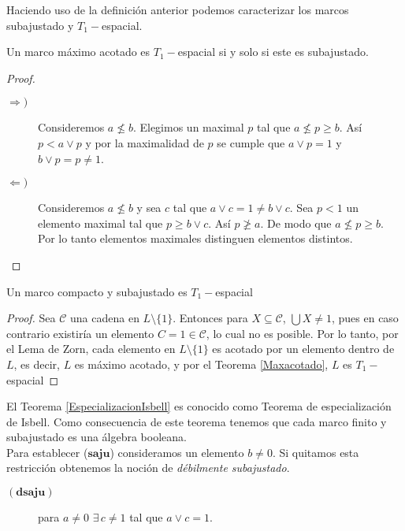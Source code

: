 \documentclass{comunicaciones}
\begin{document}
Haciendo uso de la definición anterior podemos caracterizar los marcos subajustado y $T_1-$espacial.

\begin{thm}\label{Maxacotado}
    Un marco máximo acotado es $T_1-$espacial si y solo si este es subajustado.
\end{thm}

\begin{proof}
    \begin{description}
        \item[$\Rightarrow )$] Consideremos $a\nleq b$. Elegimos un maximal $p$ tal que $a\nleq p \geq b$. Así $p< a\vee p$  y por la maximalidad de $p$ se cumple que $a\vee p=1$ y $b\vee p=p\neq 1$. 
        \item[$\Leftarrow )$] Consideremos $a\nleq b$ y sea $c$ tal que $a\vee c=1\neq b\vee c$. Sea  
        $p< 1$ un elemento maximal tal que $p\geq b\vee c$. Así $p\ngeq a$. De modo que $a\nleq p \geq b$. Por lo tanto elementos maximales distinguen elementos distintos.
    \end{description}
\end{proof}

\begin{thm}\label{EspecializacionIsbell}
    Un marco compacto y subajustado es $T_1-$espacial
\end{thm}

\begin{proof}
    Sea $\mathcal{C}$ una cadena en $L\setminus \{1\}$. Entonces para $X\subseteq \mathcal{C}$, $\bigcup X\neq 1$, pues en caso contrario existiría un elemento $C=1\in \mathcal{C}$, lo cual no es posible. Por lo tanto, por el Lema de Zorn, cada elemento en $L\setminus \{1\}$ es acotado por un elemento dentro de $L$, es decir, $L$ es máximo acotado, y por el Teorema \ref{Maxacotado}, $L$ es $T_1-$espacial
\end{proof}

El Teorema \ref{EspecializacionIsbell} es conocido como Teorema de especialización de Isbell. Como consecuencia de este teorema tenemos que cada marco finito y subajustado es una álgebra booleana.\\

Para establecer ($\textbf{saju}$) consideramos un elemento $b\neq 0$. Si quitamos esta restricción obtenemos la noción de \emph{débilmente subajustado}.

\begin{description}
    \item[$(\textbf{dsaju})$] para $a\neq 0$ $\exists\, c\neq 1$ tal que $a\vee c=1$.
\end{description}
\end{document}
